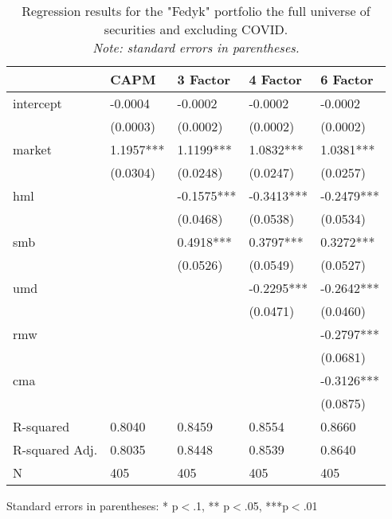 \begin{appendices}
\begin{table}
\caption{Regression results for the "Fedyk" portfolio the full universe of securities and excluding COVID. \\ \textit{Note: standard errors in parentheses.}}
\label{tab:fedyk_all_pre}
\begin{center}
\begin{tabular}{lllll}
\hline
               & CAPM      & 3 Factor   & 4 Factor   & 6 Factor    \\
\hline
intercept          & -0.0004   & -0.0002    & -0.0002    & -0.0002     \\
               & (0.0003)  & (0.0002)   & (0.0002)   & (0.0002)    \\
market           & 1.1957*** & 1.1199***  & 1.0832***  & 1.0381***   \\
               & (0.0304)  & (0.0248)   & (0.0247)   & (0.0257)    \\
hml            &           & -0.1575*** & -0.3413*** & -0.2479***  \\
               &           & (0.0468)   & (0.0538)   & (0.0534)    \\
smb            &           & 0.4918***  & 0.3797***  & 0.3272***   \\
               &           & (0.0526)   & (0.0549)   & (0.0527)    \\
umd            &           &            & -0.2295*** & -0.2642***  \\
               &           &            & (0.0471)   & (0.0460)    \\
rmw            &           &            &            & -0.2797***  \\
               &           &            &            & (0.0681)    \\
cma            &           &            &            & -0.3126***  \\
               &           &            &            & (0.0875)    \\
R-squared      & 0.8040    & 0.8459     & 0.8554     & 0.8660      \\
R-squared Adj. & 0.8035    & 0.8448     & 0.8539     & 0.8640      \\
N              & 405       & 405        & 405        & 405         \\
\hline
\end{tabular}
\end{center}
{\footnotesize Standard errors in parentheses: * p$<$.1, ** p$<$.05, ***p$<$.01\par}
\end{table}


\end{appendices}
